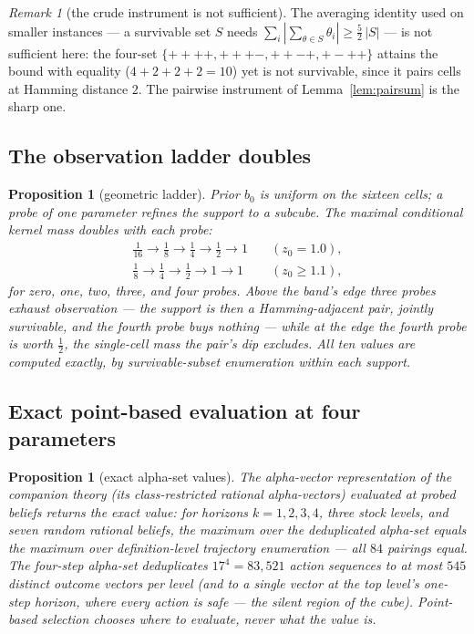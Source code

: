 \documentclass[10pt,twocolumn]{article}
\theoremstyle{plain}
\newtheorem{proposition}[theorem]{Proposition}
\theoremstyle{definition}
\theoremstyle{remark}
\newtheorem{remark}[theorem]{Remark}
\begin{document}
\begin{remark}[the crude instrument is not sufficient]
\label{rem:crude}
The averaging identity used on smaller instances --- a survivable set
\(S\) needs \(\sum_{i} |\sum_{\theta \in S} \theta_{i}| \ge
\tfrac52\,|S|\) --- is not sufficient here: the four-set
\(\{++++, +++-, ++-+, +-++\}\) attains the bound with equality
(\(4 + 2 + 2 + 2 = 10\)) yet is not survivable, since it pairs cells
at Hamming distance \(2\). The pairwise instrument of
Lemma~\ref{lem:pairsum} is the sharp one.
\end{remark}

\subsection{The observation ladder doubles}\label{ladder}

\begin{proposition}[geometric ladder]\label{prop:ladder}
Prior \(b_{0}\) is uniform on the sixteen cells; a probe of one
parameter refines the support to a subcube. The maximal conditional
kernel mass doubles with each probe:
\begin{align*}
\tfrac1{16} \to \tfrac18 \to \tfrac14 \to \tfrac12 \to 1
&\quad (z_{0} = 1.0),\\
\tfrac18 \to \tfrac14 \to \tfrac12 \to 1 \to 1
&\quad (z_{0} \ge 1.1),
\end{align*}
for zero, one, two, three, and four probes. Above the band's edge
three probes exhaust observation --- the support is then a
Hamming-adjacent pair, jointly survivable, and the fourth probe buys
nothing --- while at the edge the fourth probe is worth
\(\tfrac12\), the single-cell mass the pair's dip excludes. All ten
values are computed exactly, by survivable-subset enumeration within
each support.
\end{proposition}

\subsection{Exact point-based evaluation at four parameters}
\label{pbvi}

\begin{proposition}[exact alpha-set values]\label{prop:pbvi}
The alpha-vector representation of the companion theory (its
class-restricted rational alpha-vectors) evaluated at probed beliefs
returns the exact value: for horizons \(k = 1, 2, 3, 4\), three stock
levels, and seven random rational beliefs, the maximum over the
deduplicated alpha-set equals the maximum over definition-level
trajectory enumeration --- all \(84\) pairings equal. The four-step
alpha-set deduplicates \(17^{4} = 83{,}521\) action sequences to at
most \(545\) distinct outcome vectors per level (and to a single
vector at the top level's one-step horizon, where every action is
safe --- the silent region of the cube). Point-based selection
chooses where to evaluate, never what the value is.
\end{proposition}
\end{document}

